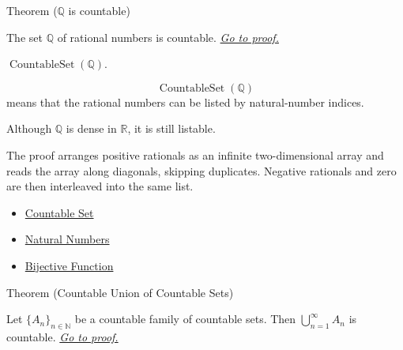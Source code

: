 
\begin{theorembox}{Theorem ($\mathbb{Q}$ is countable)}
\begin{theorem}\label{thm:Q-countable}
The set $\mathbb{Q}$ of rational numbers is countable.
\hyperref[prf:Q-countable]{\textit{Go to proof.}}
\end{theorem}
\end{theorembox}

\begin{remark*}
$\operatorname{CountableSet}(\mathbb{Q})$.
\end{remark*}

\begin{remark*}
\[
  \operatorname{CountableSet}(\mathbb{Q})
\] means that the rational numbers can
be listed by natural-number indices.
\end{remark*}

\begin{remark*}[Interpretation]
Although $\mathbb{Q}$ is dense in $\mathbb{R}$, it is still listable.
\end{remark*}

\begin{remark*}[Exposition]
The proof arranges positive rationals as an infinite two-dimensional array and
reads the array along diagonals, skipping duplicates. Negative rationals and
zero are then interleaved into the same list.
\end{remark*}

\begin{dependencies}
\begin{itemize}
  \item \hyperref[def:countable]{Countable Set}
  \item \hyperref[def:natural-numbers]{Natural Numbers}
  \item \hyperref[def:bijective]{Bijective Function}
\end{itemize}
\end{dependencies}

\begin{theorembox}{Theorem (Countable Union of Countable Sets)}
\begin{theorem}\label{thm:countable-union}
Let $\{A_n\}_{n\in\mathbb{N}}$ be a countable family of countable sets.
Then $\bigcup_{n=1}^{\infty}A_n$ is countable.
\hyperref[prf:countable-union]{\textit{Go to proof.}}
\end{theorem}
\end{theorembox}


